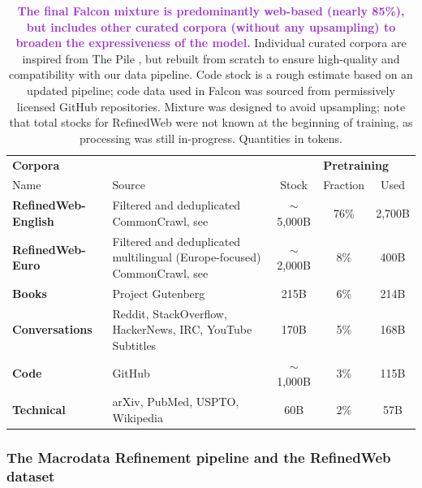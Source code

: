 \documentclass{article}
\DeclareRobustCommand{\data}[1]{\textcolor{DarkOrchid}{#1}}
\begin{document}
\begin{table}[b]
\caption{\data{\textbf{The final Falcon mixture is predominantly web-based (nearly 85\%), but includes other curated corpora (without any upsampling) to broaden the expressiveness of the model.}} Individual curated corpora are inspired from The Pile \citep{gao2020pile}, but rebuilt from scratch to ensure high-quality and compatibility with our data pipeline. Code stock is a rough estimate based on an updated pipeline; code data used in Falcon was sourced from permissively licensed GitHub repositories. Mixture was designed to avoid upsampling; note that total stocks for RefinedWeb were not known at the beginning of training, as processing was still in-progress. Quantities in tokens.}
\vspace{0.2in}
\centering
\label{tab:falcon-mixture}
\begin{tabular}{lp{5cm}ccc}
\toprule
\textbf{Corpora}    &  & & \multicolumn{2}{l}{\textbf{Pretraining}}      \\
Name                & Source          & Stock & Fraction             & Used \\ \midrule
\textbf{RefinedWeb-English} & Filtered and deduplicated CommonCrawl, see \citet{refinedweb}                 & $\sim$5,000B       & 76\%                      & 2,700B      \\
\textbf{RefinedWeb-Euro} & Filtered and deduplicated multilingual (Europe-focused) CommonCrawl, see \citet{refinedweb}                  & $\sim$2,000B      & 8\%                     & 400B     \\
\textbf{Books}   & Project Gutenberg                &  215B      &  6\%                    & 214B     \\
 \textbf{Conversations}                   & Reddit, StackOverflow, HackerNews, IRC, YouTube Subtitles                & 170B       & 5\%                     & 168B     \\
   \textbf{Code}                   & GitHub              & $\sim$1,000B       & 3\%                     & 115B     \\
  \textbf{Technical}                   & arXiv, PubMed, USPTO, Wikipedia              & 60B       & 2\%                     & 57B     \\ \bottomrule
\end{tabular}
\end{table}




\subsubsection{The Macrodata Refinement pipeline and the RefinedWeb dataset}
\end{document}
